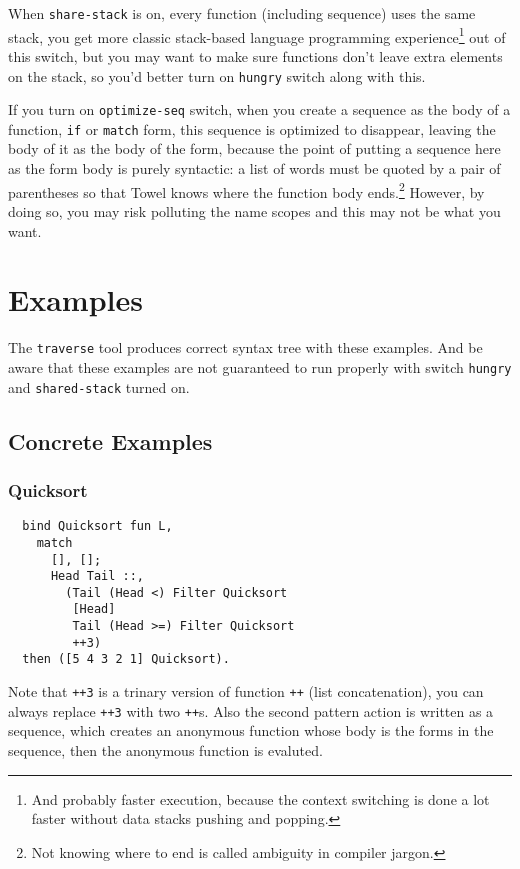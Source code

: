 \documentclass{book}
\begin{document}
When \texttt{share-stack} is on, every function (including sequence) uses the same stack, you get more classic stack-based language programming experience\footnote{And probably faster execution, because the context switching is done a lot faster without data stacks pushing and popping.} out of this switch, but you may want to make sure functions don't leave extra elements on the stack, so you'd better turn on \texttt{hungry} switch along with this.

If you turn on \texttt{optimize-seq} switch, when you create a sequence as the body of a function, \texttt{if} or \texttt{match} form, this sequence is optimized to disappear, leaving the body of it as the body of the form, because the point of putting a sequence here as the form body is purely syntactic: a list of words must be quoted by a pair of parentheses so that Towel knows where the function body ends.\footnote{Not knowing where to end is called ambiguity in compiler jargon.} However, by doing so, you may risk polluting the name scopes and this may not be what you want.

\chapter{Examples}
\label{chap:examples}

The \texttt{traverse} tool produces correct syntax tree with these examples. And be aware that these examples are not guaranteed to run properly with switch \texttt{hungry} and \texttt{shared-stack} turned on.

\section{Concrete Examples}
\subsection{Quicksort}
\begin{verbatim}
  bind Quicksort fun L,
    match
      [], [];
      Head Tail ::,
        (Tail (Head <) Filter Quicksort
         [Head]
         Tail (Head >=) Filter Quicksort
         ++3)
  then ([5 4 3 2 1] Quicksort).
\end{verbatim}

Note that \texttt{++3} is a trinary version of function \texttt{++} (list concatenation), you can always replace \texttt{++3} with two \texttt{++}s. Also the second pattern action is written as a sequence, which creates an anonymous function whose body is the forms in the sequence, then the anonymous function is evaluted.
\end{document}

